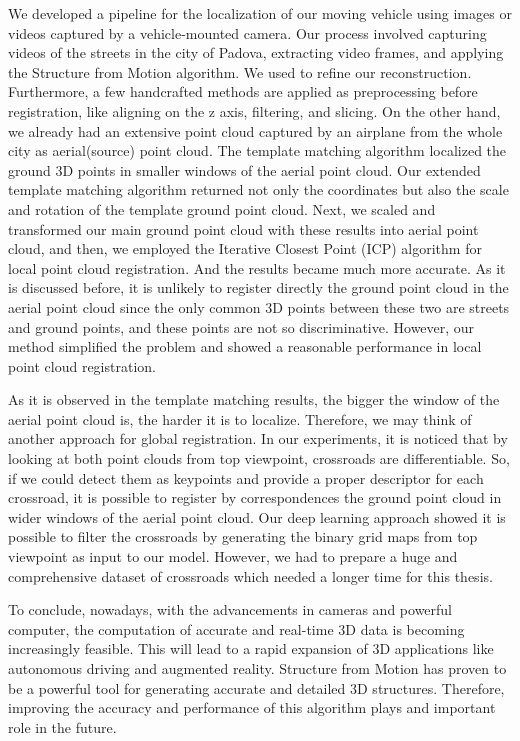 \documentclass[11pt]{article}
\begin{document}
    We developed a pipeline for the localization of our moving vehicle using images or videos captured by
    a vehicle-mounted camera. Our process involved capturing videos of the streets in the city of Padova, extracting
    video frames, and applying the Structure from Motion algorithm. We used \cite{lindenberger2021pixsfm}
    to refine our reconstruction. Furthermore, a few handcrafted methods are applied as preprocessing before
    registration, like aligning on the z axis, filtering, and slicing. On the other hand, we already had an
    extensive point cloud captured by an airplane from the whole city as aerial(source) point cloud. The template matching algorithm
    localized the ground 3D points in smaller windows of the aerial point cloud. Our extended template matching
    algorithm returned not only the coordinates but also the scale and rotation of the template ground point cloud.
    Next, we scaled and transformed our main ground point cloud with these results into aerial point cloud, and then,
    we employed the Iterative Closest Point (ICP) algorithm for local point cloud registration.
    And the results became much more accurate. As it is discussed before, it is unlikely to register directly
    the ground point cloud in the aerial point cloud
    since the only common 3D points between these two are streets and ground points, and these points
    are not so discriminative. However, our method simplified the problem and showed a reasonable performance
    in local point cloud registration.

    As it is observed in the template matching results, the bigger the window of the aerial point cloud is, the harder it is to localize.
    Therefore, we may think of another approach for global registration. In our experiments, it is noticed that by
    looking at both point clouds from top viewpoint, crossroads are differentiable. So, if we could detect them as
    keypoints and provide a proper descriptor for each crossroad, it is possible to register by correspondences
    the ground point cloud in wider windows of the aerial point cloud. Our deep learning approach showed it is
    possible to filter the crossroads by generating the binary grid maps from top viewpoint as input to our model.
    However, we had to prepare a huge and comprehensive dataset of crossroads which needed a longer time for this thesis.

    To conclude, nowadays, with the advancements in cameras and powerful computer, the computation of accurate and
    real-time 3D data is becoming increasingly feasible. This will lead to a rapid expansion of 3D applications like autonomous
    driving and augmented reality. Structure from Motion has proven to be a powerful tool for generating accurate
    and detailed 3D structures. Therefore, improving the accuracy and performance of this algorithm plays and important role in the future.
\end{document}
